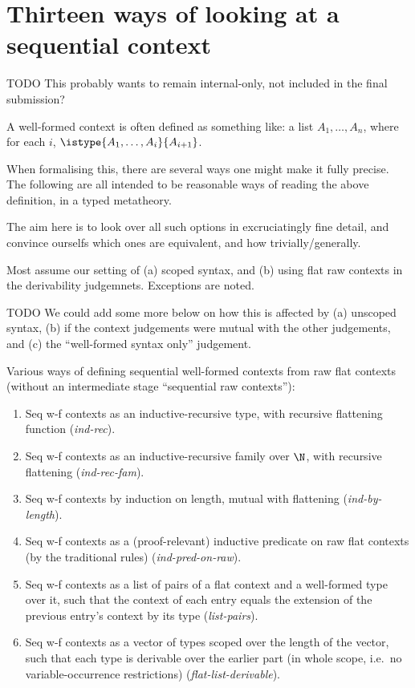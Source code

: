\section{Thirteen ways of looking at a sequential context} \label{app:sequential-context-variants}

TODO This probably wants to remain internal-only, not included in the final submission?

A well-formed context is often defined as something like: a list $A_1, \ldots, A_n$, where for each $i$, $\istype{A_1, \ldots, A_{i}}{A_{i+1}}$.

When formalising this, there are several ways one might make it fully precise.
%
The following are all intended to be reasonable ways of reading the above definition, in a typed metatheory.

The aim here is to look over all such options in excruciatingly fine detail, and convince ourselfs which ones are equivalent, and how trivially/generally.

Most assume our setting of (a) scoped syntax, and (b) using flat raw contexts in the derivability judgemnets.
%
Exceptions are noted.

TODO We could add some more below on how this is affected by (a) unscoped syntax, (b) if the context judgements were mutual with the other judgements, and (c) the “well-formed syntax only” judgement.

\newcommand{\seqcxtlabel}[1]{(\emph{#1}). \label{seqcxt:#1}}
\newcommand{\seqcxtref}[1]{\ref{seqcxt:#1} (\emph{#1})}
\newcommand{\seqrawlabel}[1]{(\emph{#1}). \label{seqraw:#1}}
\newcommand{\seqwflabel}[1]{(\emph{#1}). \label{seqwf:#1}}
\newcommand{\seqrawref}[1]{\ref{seqraw:#1} (\emph{#1})}
\newcommand{\seqwfref}[1]{(\ref{seqwf:#1}) (\emph{#1})}
\newcommand{\seqrawwfref}[2]{\ref{seqraw:#1}(\ref{seqwf:#2}) (\emph{#1}, \emph{#2})}
  
Various ways of defining sequential well-formed contexts from raw flat contexts (without an intermediate stage “sequential raw contexts”):
\begin{enumerate}
\item Seq w-f contexts as an inductive-recursive type, with recursive flattening function \seqcxtlabel{ind-rec}
\item Seq w-f contexts as an inductive-recursive family over $\N$, with recursive flattening \seqcxtlabel{ind-rec-fam}
\item Seq w-f contexts by induction on length, mutual with flattening \seqcxtlabel{ind-by-length}
\item Seq w-f contexts as a (proof-relevant) inductive predicate on raw flat contexts (by the traditional rules) \seqcxtlabel{ind-pred-on-raw}
\item Seq w-f contexts as a list of pairs of a flat context and a well-formed type over it, such that the context of each entry equals the extension of the previous entry’s context by its type \seqcxtlabel{list-pairs}
\item Seq w-f contexts as a vector of types scoped over the length of the vector, such that each type is derivable over the earlier part (in whole scope, i.e.\ no variable-occurrence restrictions) \seqcxtlabel{flat-list-derivable}
\end{enumerate} \saveitem

